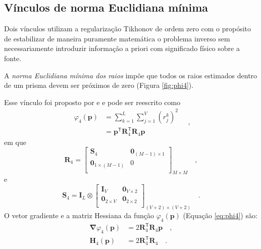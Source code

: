 \subsection{Vínculos de norma Euclidiana mínima}

Dois vínculos utilizam a regularização Tikhonov de ordem zero com o propósito de estabilizar de maneira puramente matemática o problema inverso sem necessariamente introduzir informação a priori com significado físico sobre a fonte. 

A \textit{norma Euclidiana mínima dos raios} impõe que todos os raios estimados dentro de um prisma devem ser próximos de zero (Figura \ref{fig:phi4}).

Esse vínculo foi proposto por \cite{oliveirajr_etal2011} e \cite{oliveirajr_barbosa2013} e pode ser reescrito como
\begin{equation}\label{eq:phi4}
\begin{split}
\varphi_{4}(\mathbf{p}) &= \sum\limits^{L}_{k=1}\sum\limits^{V}_{j=1}\left(r_{j}^{k}\right)^2 \\
&= \mathbf{p}^{\mathsf{T}} \mathbf{R}_{4}^{\mathsf{T}} \mathbf{R}_{4} \mathbf{p}
\end{split} \quad ,
\end{equation}
em que
\begin{equation}
\mathbf{R}_{4} = 
\begin{bmatrix}
\mathbf{S}_{4} & \mathbf{0}_{(M-1) \times 1} \\
\mathbf{0}_{1 \times (M-1)} & 0 \\
\end{bmatrix}_{M\times M} \quad ,
\label{eq:R4-matrix}
\end{equation}
e
\begin{equation}
\mathbf{S}_{4} = 
\mathbf{I}_L \otimes
\begin{bmatrix}
\mathbf{I}_{V} & \mathbf{0}_{V \times 2} \\
\mathbf{0}_{2 \times V} & \mathbf{0}_{2\times 2} \\
\end{bmatrix}_{ (V+2)\times (V+2)} \quad .
\label{eq:S4-matrix}
\end{equation}
O vetor gradiente e a matriz Hessiana da função $\varphi_{4}(\mathbf{p})$ (Equação \ref{eq:phi4}) são:
\begin{equation}\label{eq:phi4_gh}
\begin{split}
\boldsymbol{\nabla}\varphi_{4}(\mathbf{p}) &= 2\mathbf{R}^\mathsf{T}_{4}\mathbf{R}_{4}\mathbf{p} \quad ,\\
\mathbf{H}_{4}(\mathbf{p}) &= 2\mathbf{R}^\mathsf{T}_{4}\mathbf{R}_{4} \quad .
\end{split}
\end{equation}

